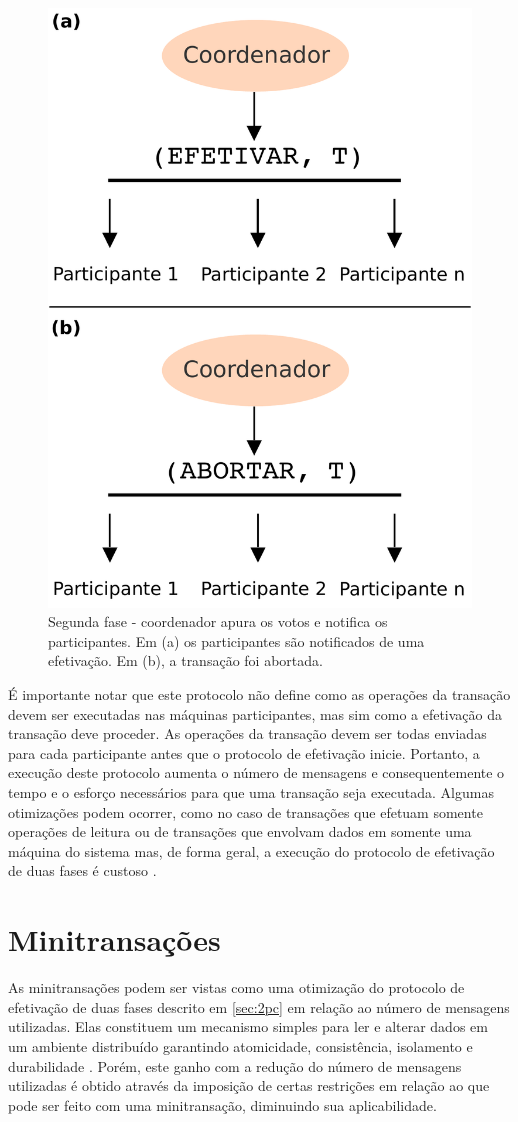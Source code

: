 \documentclass[11pt,twoside,a4paper]{book}
\begin{document}
\begin{figure}
  \centering
  \includegraphics[width=.40\textwidth]{2PC_2fase} 
  \caption{Segunda fase - coordenador apura os votos e notifica os participantes. Em (a) os participantes são notificados de uma efetivação. Em (b), a transação foi abortada.}
  \label{fig:2PC_2fase} 
\end{figure}

É importante notar que este protocolo não define como as operações da transação devem ser executadas nas máquinas participantes, mas sim como a efetivação da transação deve proceder. As operações da transação devem ser todas enviadas para cada participante antes que o protocolo de efetivação inicie. Portanto, a execução deste protocolo aumenta o número de mensagens e consequentemente o tempo e o esforço necessários para que uma transação seja executada. Algumas otimizações podem ocorrer, como no caso de transações que efetuam somente operações de leitura ou de transações que envolvam dados em somente uma máquina do sistema mas, de forma geral, a execução do protocolo de efetivação de duas fases é custoso \cite{gray-lamport}.

\section{Minitransações}
\label{sec:minitransacoes}
As minitransações podem ser vistas como uma otimização do protocolo de efetivação de duas fases descrito em \ref{sec:2pc} em relação ao número de mensagens utilizadas. Elas constituem um mecanismo simples para ler e alterar dados em um ambiente distribuído garantindo atomicidade, consistência, isolamento e durabilidade \cite{sinfonia}. Porém, este ganho com a redução do número de mensagens utilizadas é obtido através da imposição de certas restrições em relação ao que pode ser feito com uma minitransação, diminuindo sua aplicabilidade.
\end{document}
